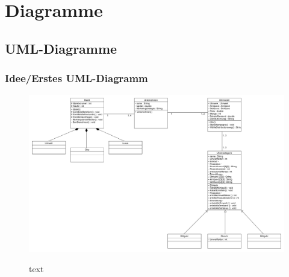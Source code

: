 \clearpage
\chapter{Diagramme}
\section{UML-Diagramme}
\subsection{Idee/Erstes UML-Diagramm}
\begin{figure} [h]
	\centering
	\includegraphics[scale=0.25, angle=90]{img/ErsterEntwurfUML.png} 
	\label{key}
	\caption{text}
\end{figure}
\clearpage
